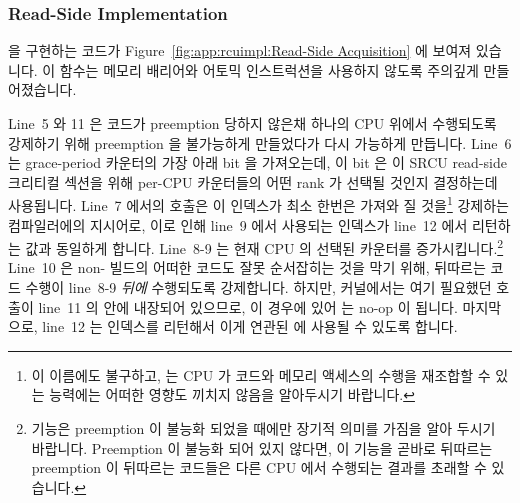 \subsubsection{Read-Side Implementation}
\label{sec:app:rcuimpl:Read-Side Implementation}

 을 구현하는 코드가
Figure~\ref{fig:app:rcuimpl:Read-Side Acquisition} 에 보여져 있습니다.
이 함수는 메모리 배리어와 어토믹 인스트럭션을 사용하지 않도록 주의깊게
만들어졌습니다.

Line~5 와 11 은 코드가 preemption 당하지 않은채 하나의 CPU 위에서 수행되도록
강제하기 위해 preemption 을 불가능하게 만들었다가 다시 가능하게 만듭니다.
Line~6 는 grace-period 카운터의 가장 아래 bit 을 가져오는데, 이 bit 은 이 SRCU
read-side 크리티컬 섹션을 위해 per-CPU 카운터들의 어떤 rank 가 선택될 것인지
결정하는데 사용됩니다.
Line~7 에서의  호출은 이 인덱스가 최소 한번은 가져와 질
것을\footnote{
	이 이름에도 불구하고,  는 CPU 가 코드와 메모리 액세스의
	수행을 재조합할 수 있는 능력에는 어떠한 영향도 끼치지 않음을 알아두시기
	바랍니다.}
강제하는 컴파일러에의 지시어로, 이로 인해 line~9 에서 사용되는 인덱스가 line~12
에서 리턴하는 값과 동일하게 합니다.
Line~8-9 는 현재 CPU 의 선택된 카운터를 증가시킵니다.\footnote{
	 기능은 preemption 이 불능화 되었을 때에만
	장기적 의미를 가짐을 알아 두시기 바랍니다.
	Preemption 이 불능화 되어 있지 않다면, 이 기능을 곧바로 뒤따르는
	preemption 이 뒤따르는 코드들은 다른 CPU 에서 수행되는 결과를 초래할 수
	있습니다.}
Line~10 은 non- 빌드의 어떠한 코드도 잘못 순서잡히는 것을
막기 위해, 뒤따르는 코드 수행이 line~8-9 \emph{뒤에} 수행되도록 강제합니다.
하지만,  커널에서는 여기 필요했던  호출이
line~11 의  안에 내장되어 있으므로, 이 경우에 있어
 는 no-op 이 됩니다.
마지막으로, line~12 는 인덱스를 리턴해서 이게 연관된  에
사용될 수 있도록 합니다.
\iffalse

